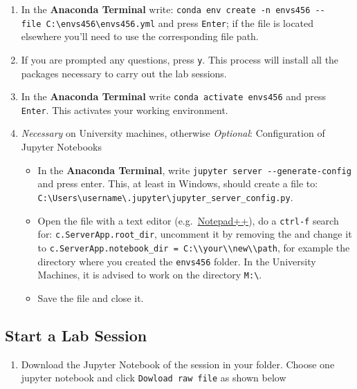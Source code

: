 \documentclass[
  letterpaper,
  DIV=11,
  numbers=noendperiod]{scrreprt}
\providecommand{\tightlist}{%
  \setlength{\itemsep}{0pt}\setlength{\parskip}{0pt}}\usepackage{longtable,booktabs,array}
\begin{document}
\begin{enumerate}
\def\labelenumi{\arabic{enumi}.}
\setcounter{enumi}{2}
\tightlist
\item
  In the \textbf{Anaconda Terminal} write:
  \texttt{conda\ env\ create\ -n\ envs456\ -\/-file\ C:\textbackslash{}envs456\textbackslash{}envs456.yml}
  and press \texttt{Enter}; if the file is located elsewhere you'll need
  to use the corresponding file path.
\item
  If you are prompted any questions, press \texttt{y}. This process will
  install all the packages necessary to carry out the lab sessions.
\item
  In the \textbf{Anaconda Terminal} write
  \texttt{conda\ activate\ envs456} and press \texttt{Enter}. This
  activates your working environment.
\item
  \emph{Necessary} on University machines, otherwise \emph{Optional}:
  Configuration of Jupyter Notebooks

  \begin{itemize}
  \tightlist
  \item
    In the \textbf{Anaconda Terminal}, write
    \texttt{jupyter\ server\ -\/-generate-config} and press enter. This,
    at least in Windows, should create a file to:
    \texttt{C:\textbackslash{}Users\textbackslash{}username\textbackslash{}.jupyter\textbackslash{}jupyter\_server\_config.py}.
  \item
    Open the file with a text editor
    (e.g.~\href{https://notepad-plus-plus.org}{Notepad++}), do a
    \texttt{ctrl-f} search for: \texttt{c.ServerApp.root\_dir},
    uncomment it by removing the and change it to
    \texttt{c.ServerApp.notebook\_dir\ =\ \textquotesingle{}C:\textbackslash{}\textbackslash{}your\textbackslash{}\textbackslash{}new\textbackslash{}\textbackslash{}path},
    for example the directory where you created the \texttt{envs456}
    folder. In the University Machines, it is advised to work on the
    directory \texttt{M:\textbackslash{}}.
  \item
    Save the file and close it.
  \end{itemize}
\end{enumerate}

\subsection*{Start a Lab Session}\label{start-a-lab-session}

\begin{enumerate}
\def\labelenumi{\arabic{enumi}.}
\tightlist
\item
  Download the Jupyter Notebook of the session in your folder. Choose
  one jupyter notebook and click \texttt{Dowload\ raw\ file} as shown
  below
\end{enumerate}
\end{document}
